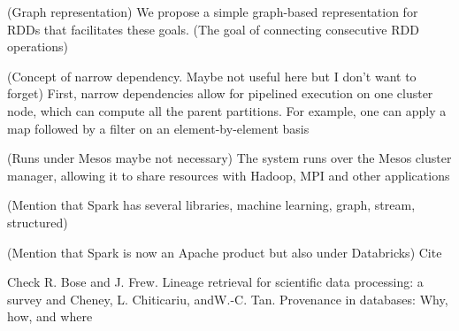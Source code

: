 (Graph representation) We propose a simple graph-based representation for RDDs that facilitates these goals. (The goal of connecting consecutive RDD operations) \cite{Zaharia2012a}

(Concept of narrow dependency. Maybe not useful here but I don't want to forget) First, narrow dependencies allow for pipelined execution on one cluster node, which can compute all the parent partitions. For example, one can apply a map followed by a filter on an element-by-element basis \cite{Zaharia2012a}

(Runs under Mesos maybe not necessary) The system runs over the Mesos cluster manager, allowing it to share resources with Hadoop, MPI and other applications \cite{Zaharia2012a}

(Mention that Spark has several libraries, machine learning, graph, stream, structured)

(Mention that Spark is now an Apache product but also under Databricks) Cite \cite{WebSpark2017}

Check R. Bose and J. Frew. Lineage retrieval for scientific data processing: a survey and Cheney, L. Chiticariu, andW.-C. Tan. Provenance in databases: Why, how, and where